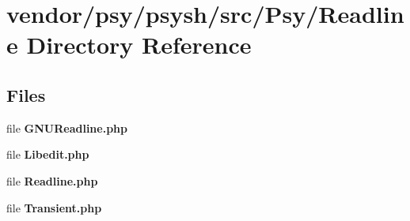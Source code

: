 \section{vendor/psy/psysh/src/\+Psy/\+Readline Directory Reference}
\label{dir_7f8cdfd5313bee2c4e2ef6ec355a5798}
\subsection*{Files}
\begin{DoxyCompactItemize}
\item 
file {\bf G\+N\+U\+Readline.\+php}
\item 
file {\bf Libedit.\+php}
\item 
file {\bf Readline.\+php}
\item 
file {\bf Transient.\+php}
\end{DoxyCompactItemize}

